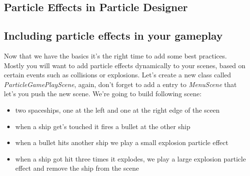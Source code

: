 \documentclass{scrreprt}
\begin{document}
\subsection{Particle Effects in Particle Designer}
\subsection{Including particle effects in your gameplay}
Now that we have the basics it's the right time to add some best practices.
Mostly you will want to add particle effects dynamically to your scenes, based
on certain events such as collisions or explosions. Let's create a new class
called \textit{ParticleGamePlayScene}, again, don't forget to add a entry to
\textit{MenuScene} that let's you push the new scene.
We're going to build following scene:
 \begin{itemize}
   \item two spaceships, one at the left and one at the right edge of the sceen
   \item when a ship get's touched it fires a bullet at the other ship
   \item when a bullet hits another ship we play a small explosion particle
   effect
   \item when a ship got hit three times it explodes, we play a large explosion
   particle effect and remove the ship from the scene 
\end{itemize}
 
\end{document}
